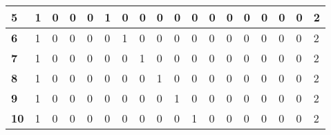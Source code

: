 \begin{center}
\begin{longtable}{|P{0.3cm}|P{0.3cm}|P{0.3cm}|P{0.3cm}|P{0.3cm}|P{0.3cm}|P{0.3cm}|P{0.3cm}|P{0.3cm}|P{0.3cm}|P{0.3cm}|P{0.3cm}|P{0.3cm}|P{0.3cm}|P{0.3cm}|P{0.3cm}|P{0.3cm}|P{1.4cm}|}
\textbf{5}                         & 1                     & 0                     & 0                     & 0                     & 1                     & 0                     & 0                     & 0                     & 0                     & 0                     & 0                     & 0                     & 0                     & 0                     & 0                     & 0                     & 2                     \\ \hline
\textbf{6}                         & 1                     & 0                     & 0                     & 0                     & 0                     & 1                     & 0                     & 0                     & 0                     & 0                     & 0                     & 0                     & 0                     & 0                     & 0                     & 0                     & 2                     \\ \hline
\textbf{7}                         & 1                     & 0                     & 0                     & 0                     & 0                     & 0                     & 1                     & 0                     & 0                     & 0                     & 0                     & 0                     & 0                     & 0                     & 0                     & 0                     & 2                     \\ \hline
\textbf{8}                         & 1                     & 0                     & 0                     & 0                     & 0                     & 0                     & 0                     & 1                     & 0                     & 0                     & 0                     & 0                     & 0                     & 0                     & 0                     & 0                     & 2                     \\ \hline
\textbf{9}                         & 1                     & 0                     & 0                     & 0                     & 0                     & 0                     & 0                     & 0                     & 1                     & 0                     & 0                     & 0                     & 0                     & 0                     & 0                     & 0                     & 2                     \\ \hline
\textbf{10}                        & 1                     & 0                     & 0                     & 0                     & 0                     & 0                     & 0                     & 0                     & 0                     & 1                     & 0                     & 0                     & 0                     & 0                     & 0                     & 0                     & 2                     \\ \hline

\end{longtable}
\end{center}
